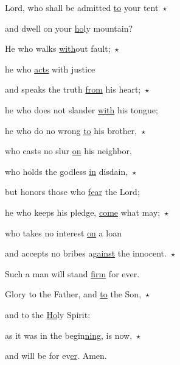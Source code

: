 \noindent Lord, who shall be admitted \uline{to} your tent~$\star$~\nopagebreak

and dwell on your \uline{ho}ly mountain?

\noindent He who walks \uline{with}out fault;~$\star$~\nopagebreak

he who \uline{acts} with justice

\noindent and speaks the truth \uline{from} his heart;~$\star$~\nopagebreak

he who does not slander \uline{with} his tongue;

\noindent he who do no wrong \uline{to} his brother,~$\star$~\nopagebreak

who casts no slur \uline{on} his neighbor,

\noindent who holds the godless \uline{in} disdain,~$\star$~\nopagebreak

but honors those who \uline{fear} the Lord;

\noindent he who keeps his pledge, \uline{come} what may;~$\star$~\nopagebreak

who takes no interest \uline{on} a loan

\noindent and accepts no bribes a\uline{gainst} the innocent.~$\star$~\nopagebreak

Such a man will stand \uline{firm} for ever.

\noindent Glory to the Father, and \uline{to} the Son,~$\star$~\nopagebreak

and to the \uline{Ho}ly Spirit:

\noindent as it was in the begin\uline{ning}, is now,~$\star$~\nopagebreak

and will be for ev\uline{er}. Amen.
